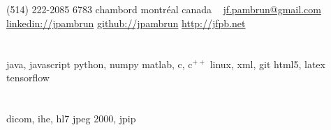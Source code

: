 \documentclass[print]{friggeri-cv}
\begin{document}

\newcommand{\eletr}{\href{http://www.etsmtl.ca/Programmes-Etudes/1er-cycle/Fiche-de-cours?Sigle=ELE747}{ele{\footnotesize747}}}
\newcommand{\eleenv}{\href{http://www.etsmtl.ca/Programmes-Etudes/1er-cycle/Fiche-de-cours?Sigle=ELE116}{ele{\footnotesize116}}}
\newcommand{\infmat}{\href{http://www.polymtl.ca/etudes/cours/details.php?sigle=INF1005a}{inf{\footnotesize1005}a}}
\newcommand{\gtssys}{\href{http://www.etsmtl.ca/Futurs-etudiants/Cycles-sup/Fiche-de-cours?Sigle=GTS840}{gts{\footnotesize840}}}

\begin{aside}
  \section{}
  {\small(514) 222-2085}
  {\small6783} chambord
  montréal
  canada
  ~
  \href{mailto:jf.pambrun@gmail.com}{jf.pambrun@gmail.com}
  \href{https://ca.linkedin.com/in/jpambrun}{linkedin://jpambrun}
  \href{http://github.com/jpambrun}{github://jpambrun}
  \href{http://jfpb.net}{http://jfpb.net}
  \section{}
  \section{}
  java, javascript
  python, numpy
  matlab, c, c{\tiny$^{++}$}
  linux, xml, git
  html{\small5}, latex
  tensorflow
  \section{}
  dicom, ihe, hl{\small7}
  jpeg {\small2000}, jpip

\end{aside}
\end{document}
